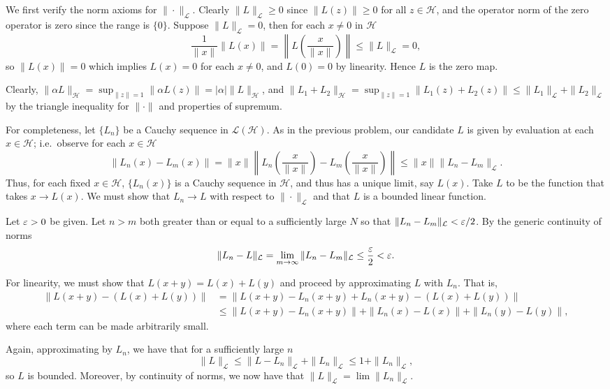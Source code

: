 \documentclass{homework}
\begin{document}
\begin{solution}
  We first verify the norm axioms for $\|\cdot\|_{\mathcal L}$.  Clearly $\|L\|_{\mathcal L} \ge 0$ since $\|L(z)\| \ge 0$ for all $z \in \mathcal H$, and the operator norm of the zero operator is zero since the range is $\{0\}$.  Suppose $\|L\|_{\mathcal L} = 0$, then for each $x \not= 0$ in $\mathcal H$ 
  $$
    \frac {1}{\|x\|} \|L(x)\| = \left\| L\left(\frac x{\|x\|} \right) \right\| \le \|L\|_{\mathcal L} = 0,
  $$
  so $\|L(x)\| = 0$ which implies $L(x) = 0$ for each $x\not=0$, and $L(0) = 0$ by linearity. Hence $L$ is the zero map.

  Clearly, $\|\alpha L\|_{\mathcal H} = \sup_{\|z\| =1} \|\alpha L(z)\| = |\alpha| \|L\|_{\mathcal H}$, and $\|L_1 + L_2\|_{\mathcal H} = \sup_{\|z\| = 1} \|L_1(z) + L_2(z)\| \le \|L_1\|_{\mathcal L} + \|L_2\|_{\mathcal L}$ by the triangle inequality for $\|\cdot\|$ and properties of supremum.
    
  For completeness, let $\{L_n\}$ be a Cauchy sequence in $\mathcal L(\mathcal H)$.  As in the previous problem, our candidate $L$ is given by evaluation at each $x \in \mathcal H$; i.e.~observe for each $x \in \mathcal H$
  $$
    \|L_n(x) - L_m(x)\| = \|x\| \left\|L_n\left(\frac x{\|x\|}\right) - L_m\left(\frac x{\|x\|}\right)\right\| \le \|x\| \| L_n - L_m \|_{\mathcal L}.
  $$
  Thus, for each fixed $x \in \mathcal H$, $\{L_n(x)\}$ is a Cauchy sequence in $\mathcal H$, and thus has a unique limit, say $L(x)$. Take $L$ to be the function that takes $x \to L(x)$.  We must show that $L_n \to L$ with respect to $\|\cdot\|_{\mathcal L}$ and that $L$ is a bounded linear function.

  Let $\varepsilon >0$ be given. Let $n>m$ both greater than or equal to a sufficiently large $N$ so that $\|L_n - L_m\|_{\mathcal L} < \varepsilon/2$.  By the generic continuity of norms
  $$
     \|L_n - L\|_{\mathcal L}= \lim_{m\to\infty} \|L_n - L_m\|_{\mathcal L} \le \frac {\varepsilon}2 < \varepsilon.
  $$

  For linearity, we must show that $L(x+y) = L(x) + L(y)$ and proceed by approximating $L$ with $L_n$. That is,
  \begin{align*}
    \|L(x + y) - (L(x) + L(y))\| 
    &= \|L(x+y) - L_n(x+y) + L_n(x+y) -(L(x) + L(y))\| \\
    &\le \|L(x+y) - L_n(x+y)\| + \|L_n(x) - L(x)\| + \|L_n(y) - L(y)\|,
  \end{align*}
  where each term can be made arbitrarily small.

  Again, approximating by $L_n$, we have that for a sufficiently large $n$
  $$
    \| L \|_{\mathcal L} \le \| L - L_n \|_{\mathcal L} + \|L_n\|_{\mathcal L} \le 1 + \|L_n\|_{\mathcal L},
  $$
  so $L$ is bounded.  Moreover, by continuity of norms, we now have that $\|L\|_{\mathcal L} = \lim \|L_n\|_{\mathcal L}$.
\vspace{-.5em}
\end{solution}
\end{document}
